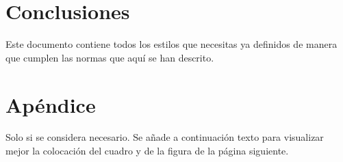 \documentclass[twocolumn,twoside,a4paper, 10pt]{IEEEtran}
\begin{document}
\section{Conclusiones}

Este documento contiene todos los estilos que necesitas ya definidos de manera que cumplen las normas que aquí se han descrito.

\section{Apéndice}
Solo si se considera necesario. Se añade a continuación texto para visualizar mejor la colocación del cuadro y de la figura de la página siguiente.\\ 
\lipsum[3-6]



\end{document}
